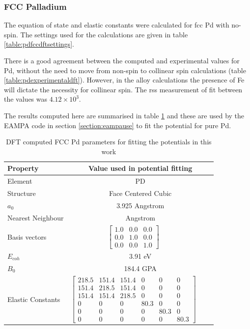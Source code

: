 \subsubsection{FCC Palladium}

The equation of state and elastic constants were calculated for \acrshort{fcc} Pd with no-spin.  The settings used for the calculations are given in table \ref{table:pdfccdftsettings}. 

There is a good agreement between the computed and experimental values for Pd, without the need to move from non-spin to collinear spin calculations (table \ref{table:pdexperimentaldft}).  However, in the alloy calculations the  presence of Fe will dictate the necessity for collinear spin.  The \acrshort{rss} measurement of fit between the values was $4.12 \times 10^3$.

The results computed here are summarised in table \ref{table:pdinputparameters} and these are used by the EAMPA code in section \ref{section:eampause} to fit the potential for pure \Gls{Pd}.

\begin{table}[h]
\renewcommand{\arraystretch}{1.2}
\centering
\begin{tabular}{lccc}
\hline\hline
Property & \multicolumn{3}{c}{Value used in potential fitting} \\
\hline\hline
Element & \multicolumn{3}{c}{PD}\\
Structure             & \multicolumn{3}{c}{Face Centered Cubic}\\
$a_0$                 & \multicolumn{3}{c}{3.925 Angstrom \cite{webelementspd}}\\
Nearest Neighbour     & \multicolumn{3}{c}{ Angstrom \cite{webelementspd}}\\
Basis vectors         & $\begin{bmatrix} 1.0 & 0.0 & 0.0 \\ 0.0 & 1.0 & 0.0 \\ 0.0 & 0.0 & 1.0  \end{bmatrix}$ \\
$E_{coh}$             & \multicolumn{3}{c}{3.91 eV \cite{semiempiricalpots}}   \\
$B_0$                 & \multicolumn{3}{c}{184.4 GPA \cite{semiempiricalpots}}   \\
Elastic Constants     & $\begin{bmatrix} 218.5 & 151.4 & 151.4 & 0 & 0 & 0 \\ 151.4 & 218.5 & 151.4 & 0 & 0 & 0 \\ 151.4 & 151.4 & 218.5 & 0 & 0 & 0 \\ 0 & 0 & 0 & 80.3 & 0 & 0 \\ 0 & 0 & 0 & 0 & 80.3 & 0 \\ 0 & 0 & 0 & 0 & 0 & 80.3 \end{bmatrix}$ \\
\hline\hline
\end{tabular}
\caption{DFT computed FCC Pd parameters for fitting the potentials in this work}
\label{table:pdinputparameters}
\end{table}





